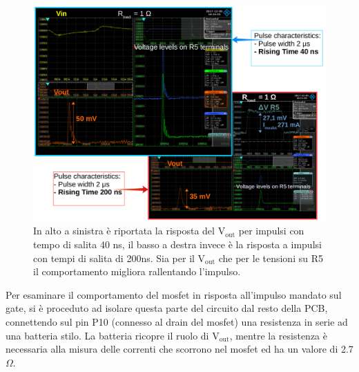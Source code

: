 \begin{figure}
\centering
\includegraphics[width=\linewidth]{Immagini/RiseTime}
\caption{In alto a sinistra è riportata la risposta del $\mathrm{V_{out}}$ per impulsi con tempo di salita 40 ns, il basso a destra invece è la risposta a impulsi con tempi di salita di 200ns. Sia per il $\mathrm{V_{out}}$ che per le tensioni su R5 il comportamento migliora rallentando l'impulso.}
\label{RiseTime}
\end{figure}

Per esaminare il comportamento del mosfet in risposta all'impulso mandato sul gate, si è proceduto ad isolare questa parte del circuito dal resto della PCB, connettendo sul pin P10 (connesso al drain del mosfet) una resistenza in serie ad una batteria stilo.
La batteria ricopre il ruolo di $\mathrm{V_{out}}$, mentre la resistenza è necessaria alla misura delle correnti che scorrono nel mosfet ed ha un valore di 2.7 $\Omega$. 



